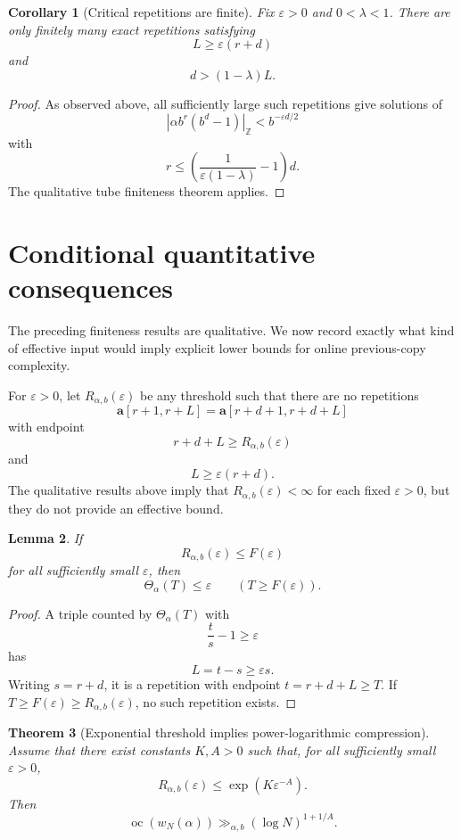 \documentclass[11pt]{amsart}
\newtheorem{theorem}{Theorem}[section]
\newtheorem{corollary}[theorem]{Corollary}
\newtheorem{lemma}[theorem]{Lemma}
\DeclareMathOperator{\oc}{oc}
\newcommand{\normZ}[1]{\left|#1\right|_{\mathbb Z}}
\begin{document}
\begin{corollary}[Critical repetitions are finite]
Fix \(\varepsilon>0\) and \(0<\lambda<1\). There are only finitely many exact repetitions satisfying
\[
L\geq\varepsilon(r+d)
\]
and
\[
d>(1-\lambda)L.
\]
\end{corollary}

\begin{proof}
As observed above, all sufficiently large such repetitions give solutions of
\[
\normZ{\alpha b^r(b^d-1)}<b^{-\varepsilon d/2}
\]
with
\[
r\leq
\left(\frac{1}{\varepsilon(1-\lambda)}-1\right)d.
\]
The qualitative tube finiteness theorem applies.
\end{proof}

\section{Conditional quantitative consequences}

The preceding finiteness results are qualitative. We now record exactly what kind of effective input would imply explicit lower bounds for online previous-copy complexity.

For \(\varepsilon>0\), let \(R_{\alpha,b}(\varepsilon)\) be any threshold such that there are no repetitions
\[
\mathbf a[r+1,r+L]=\mathbf a[r+d+1,r+d+L]
\]
with endpoint
\[
r+d+L\geq R_{\alpha,b}(\varepsilon)
\]
and
\[
L\geq \varepsilon(r+d).
\]
The qualitative results above imply that \(R_{\alpha,b}(\varepsilon)<\infty\) for each fixed \(\varepsilon>0\), but they do not provide an effective bound.

\begin{lemma}
If
\[
R_{\alpha,b}(\varepsilon)\leq F(\varepsilon)
\]
for all sufficiently small \(\varepsilon\), then
\[
\Theta_\alpha(T)\leq \varepsilon
\qquad
(T\geq F(\varepsilon)).
\]
\end{lemma}

\begin{proof}
A triple counted by \(\Theta_\alpha(T)\) with
\[
\frac{t}{s}-1\geq\varepsilon
\]
has
\[
L=t-s\geq\varepsilon s.
\]
Writing \(s=r+d\), it is a repetition with endpoint \(t=r+d+L\geq T\). If \(T\geq F(\varepsilon)\geq R_{\alpha,b}(\varepsilon)\), no such repetition exists.
\end{proof}

\begin{theorem}[Exponential threshold implies power-logarithmic compression]
Assume that there exist constants \(K,A>0\) such that, for all sufficiently small \(\varepsilon>0\),
\[
R_{\alpha,b}(\varepsilon)
\leq
\exp(K\varepsilon^{-A}).
\]
Then
\[
\oc(w_N(\alpha))
\gg_{\alpha,b}
(\log N)^{1+1/A}.
\]
\end{theorem}
\end{document}
